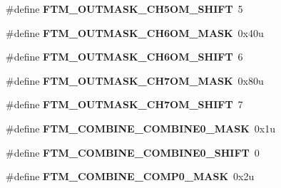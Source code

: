 \begin{DoxyCompactItemize}
\item 
\#define {\bfseries F\+T\+M\+\_\+\+O\+U\+T\+M\+A\+S\+K\+\_\+\+C\+H5\+O\+M\+\_\+\+S\+H\+I\+FT}~5\hypertarget{group__FTM__Register__Masks_ga788fa594e321e3c5ae5b0dea445caf4c}{}\label{group__FTM__Register__Masks_ga788fa594e321e3c5ae5b0dea445caf4c}

\item 
\#define {\bfseries F\+T\+M\+\_\+\+O\+U\+T\+M\+A\+S\+K\+\_\+\+C\+H6\+O\+M\+\_\+\+M\+A\+SK}~0x40u\hypertarget{group__FTM__Register__Masks_ga015da8c828efae7c503a3a1d87c9007a}{}\label{group__FTM__Register__Masks_ga015da8c828efae7c503a3a1d87c9007a}

\item 
\#define {\bfseries F\+T\+M\+\_\+\+O\+U\+T\+M\+A\+S\+K\+\_\+\+C\+H6\+O\+M\+\_\+\+S\+H\+I\+FT}~6\hypertarget{group__FTM__Register__Masks_ga6c7e53365e176cea807c9d68ce0fb6ad}{}\label{group__FTM__Register__Masks_ga6c7e53365e176cea807c9d68ce0fb6ad}

\item 
\#define {\bfseries F\+T\+M\+\_\+\+O\+U\+T\+M\+A\+S\+K\+\_\+\+C\+H7\+O\+M\+\_\+\+M\+A\+SK}~0x80u\hypertarget{group__FTM__Register__Masks_gadf061026503672ed642b2d2f599afb98}{}\label{group__FTM__Register__Masks_gadf061026503672ed642b2d2f599afb98}

\item 
\#define {\bfseries F\+T\+M\+\_\+\+O\+U\+T\+M\+A\+S\+K\+\_\+\+C\+H7\+O\+M\+\_\+\+S\+H\+I\+FT}~7\hypertarget{group__FTM__Register__Masks_gae1b4dc666609c954526cc0f83bf18ce3}{}\label{group__FTM__Register__Masks_gae1b4dc666609c954526cc0f83bf18ce3}

\item 
\#define {\bfseries F\+T\+M\+\_\+\+C\+O\+M\+B\+I\+N\+E\+\_\+\+C\+O\+M\+B\+I\+N\+E0\+\_\+\+M\+A\+SK}~0x1u\hypertarget{group__FTM__Register__Masks_gaf48cb997d418c07e063179fa8459c75a}{}\label{group__FTM__Register__Masks_gaf48cb997d418c07e063179fa8459c75a}

\item 
\#define {\bfseries F\+T\+M\+\_\+\+C\+O\+M\+B\+I\+N\+E\+\_\+\+C\+O\+M\+B\+I\+N\+E0\+\_\+\+S\+H\+I\+FT}~0\hypertarget{group__FTM__Register__Masks_gabe1e557f9bbddbbe13beac964fa07c1f}{}\label{group__FTM__Register__Masks_gabe1e557f9bbddbbe13beac964fa07c1f}

\item 
\#define {\bfseries F\+T\+M\+\_\+\+C\+O\+M\+B\+I\+N\+E\+\_\+\+C\+O\+M\+P0\+\_\+\+M\+A\+SK}~0x2u\hypertarget{group__FTM__Register__Masks_ga4ac7b3d3c5869c8c8af75bdc506e7c81}{}\label{group__FTM__Register__Masks_ga4ac7b3d3c5869c8c8af75bdc506e7c81}


\end{DoxyCompactItemize}
